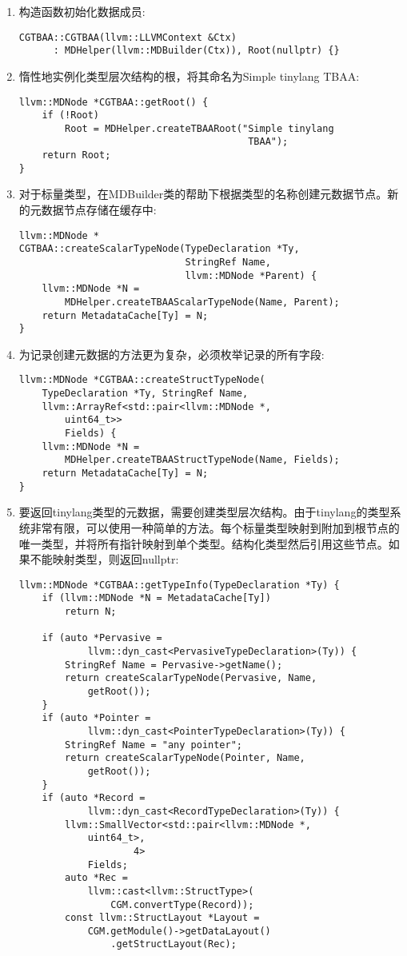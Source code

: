 \begin{enumerate}
\item 构造函数初始化数据成员:
\begin{lstlisting}[caption={}]
CGTBAA::CGTBAA(llvm::LLVMContext &Ctx)
	  : MDHelper(llvm::MDBuilder(Ctx)), Root(nullptr) {}
\end{lstlisting}

\item 惰性地实例化类型层次结构的根，将其命名为Simple tinylang TBAA:
\begin{lstlisting}[caption={}]
llvm::MDNode *CGTBAA::getRoot() {
	if (!Root)
		Root = MDHelper.createTBAARoot("Simple tinylang 
										TBAA");
	return Root;
}
\end{lstlisting}

\item 对于标量类型，在MDBuilder类的帮助下根据类型的名称创建元数据节点。新的元数据节点存储在缓存中:
\begin{lstlisting}[caption={}]
llvm::MDNode *
CGTBAA::createScalarTypeNode(TypeDeclaration *Ty,
							 StringRef Name,
							 llvm::MDNode *Parent) {
	llvm::MDNode *N =
		MDHelper.createTBAAScalarTypeNode(Name, Parent);
	return MetadataCache[Ty] = N;
}
\end{lstlisting}

\item 为记录创建元数据的方法更为复杂，必须枚举记录的所有字段:
\begin{lstlisting}[caption={}]
llvm::MDNode *CGTBAA::createStructTypeNode(
	TypeDeclaration *Ty, StringRef Name,
	llvm::ArrayRef<std::pair<llvm::MDNode *, 
		uint64_t>>
		Fields) {
	llvm::MDNode *N =
		MDHelper.createTBAAStructTypeNode(Name, Fields);
	return MetadataCache[Ty] = N;
}
\end{lstlisting}

\item 要返回tinylang类型的元数据，需要创建类型层次结构。由于tinylang的类型系统非常有限，可以使用一种简单的方法。每个标量类型映射到附加到根节点的唯一类型，并将所有指针映射到单个类型。结构化类型然后引用这些节点。如果不能映射类型，则返回nullptr:
\begin{lstlisting}[caption={}]
llvm::MDNode *CGTBAA::getTypeInfo(TypeDeclaration *Ty) {
	if (llvm::MDNode *N = MetadataCache[Ty])
		return N;
	
	if (auto *Pervasive =
			llvm::dyn_cast<PervasiveTypeDeclaration>(Ty)) {
		StringRef Name = Pervasive->getName();
		return createScalarTypeNode(Pervasive, Name, 
			getRoot());
	}
	if (auto *Pointer =
			llvm::dyn_cast<PointerTypeDeclaration>(Ty)) {
		StringRef Name = "any pointer";
		return createScalarTypeNode(Pointer, Name, 
			getRoot());
	}
	if (auto *Record =
			llvm::dyn_cast<RecordTypeDeclaration>(Ty)) {
		llvm::SmallVector<std::pair<llvm::MDNode *, 
			uint64_t>,
					4>
			Fields;
		auto *Rec =
			llvm::cast<llvm::StructType>(
				CGM.convertType(Record));
		const llvm::StructLayout *Layout =
			CGM.getModule()->getDataLayout()
				.getStructLayout(Rec);
			

\end{lstlisting}
\end{enumerate}

